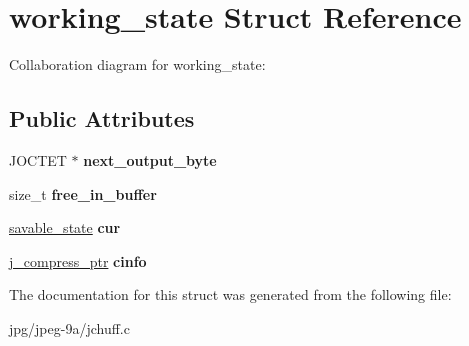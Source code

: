 \hypertarget{structworking__state}{\section{working\+\_\+state Struct Reference}
\label{structworking__state}
}


Collaboration diagram for working\+\_\+state\+:
\subsection*{Public Attributes}
\begin{DoxyCompactItemize}
\item 
\hypertarget{structworking__state_aa672d560261c7d8bb78f4014489f9661}{J\+O\+C\+T\+E\+T $\ast$ {\bfseries next\+\_\+output\+\_\+byte}}\label{structworking__state_aa672d560261c7d8bb78f4014489f9661}

\item 
\hypertarget{structworking__state_a2a369c125a91f2aaebbb71ab52e37e7e}{size\+\_\+t {\bfseries free\+\_\+in\+\_\+buffer}}\label{structworking__state_a2a369c125a91f2aaebbb71ab52e37e7e}

\item 
\hypertarget{structworking__state_a9a55a26239810c0d5ec42c165ee74101}{\hyperlink{structsavable__state}{savable\+\_\+state} {\bfseries cur}}\label{structworking__state_a9a55a26239810c0d5ec42c165ee74101}

\item 
\hypertarget{structworking__state_ae54d796ba9c39bb85a922db336e3157b}{\hyperlink{structjpeg__compress__struct}{j\+\_\+compress\+\_\+ptr} {\bfseries cinfo}}\label{structworking__state_ae54d796ba9c39bb85a922db336e3157b}

\end{DoxyCompactItemize}


The documentation for this struct was generated from the following file\+:\begin{DoxyCompactItemize}
\item 
jpg/jpeg-\/9a/jchuff.\+c\end{DoxyCompactItemize}
